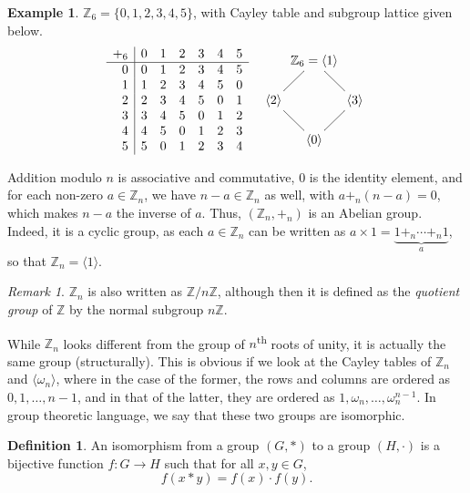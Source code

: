 \documentclass[svgnames]{article}
\theoremstyle{definition}
\newtheorem{Definition}[Definition]{Definition}
\newtheorem{Example}[Example]{Example}
\theoremstyle{remark}
\newtheorem*{Remark*}{Remark}
\newcommand{\nth}{\textsuperscript{th}\xspace}
\newcommand{\newterm}[1]{{\color{alertcolor} #1}}
\begin{document}
\begin{appendices}
\begin{Example}\label{ex:Z6}
$\mathbb Z_6 = \{0, 1, 2, 3, 4, 5\}$, with Cayley table and subgroup lattice given below.
\begin{align*}
\begin{array}{r|cccccc}
+_6		&	0	&	1	&	2	&	3	&	4	&	5\\
\hline
0		&	0	&	1	&	2	&	3	&	4	&	5\\
1		&	1	&	2	&	3	&	4	&	5	&	0\\
2		&	2	&	3	&	4	&	5	&	0	&	1\\
3		&	3	&	4	&	5	&	0	&	1	&	2\\
4		&	4	&	5	&	0	&	1	&	2	&	3\\
5		&	5	&	0	&	1	&	2	&	3	&	4
\end{array} && 
\vcenter{\xymatrix@C=1px@R=1.5em{
&	\mathbb Z_6 = \langle 1 \rangle \ar@{-}[dl] \ar@{-}[dr]\\
\langle 2 \rangle && \langle 3 \rangle\\
& \langle 0 \rangle \ar@{-}[ul] \ar@{-}[ur]
}}
\end{align*}
\end{Example}

Addition modulo $n$ is associative and commutative, $0$ is the identity element, and for each non-zero $a \in \mathbb Z_n$, we have $n - a \in \mathbb Z_n$ as well, with $a +_n (n - a) = 0$, which makes $n - a$ the inverse of $a$. Thus, $(\mathbb Z_n, +_n)$ is an Abelian group. Indeed, it is a cyclic group, as each $a \in \mathbb Z_n$ can be written as $a \times 1 = \underbrace{1 +_n \cdots +_n 1}_{a}$, so that $\mathbb Z_n = \langle 1 \rangle$.

\begin{Remark*}
$\mathbb Z_n$ is also written as $\mathbb Z/n \mathbb Z$, although then it is defined as the \emph{quotient group} of $\mathbb Z$ by the normal subgroup $n \mathbb Z$.
\end{Remark*}

While $\mathbb Z_n$ looks different from the group of $n$\nth roots of unity, it is actually the same group (structurally). This is obvious if we look at the Cayley tables of $\mathbb Z_n$ and $\langle \omega_n \rangle$, where in the case of the former, the rows and columns are ordered as $0, 1, \ldots, n - 1$, and in that of the latter, they are ordered as $1, \omega_n, \ldots, \omega_n^{n - 1}$. In group theoretic language, we say that these two groups are \newterm{isomorphic}.

\begin{Definition}\label{def:Isomorphism}
An isomorphism from a group $(G, *)$ to a group $(H, \cdot)$ is a bijective function $f \colon G \to H$ such that for all $x, y \in G$,
\begin{equation*}
f(x * y) = f(x) \cdot f(y).
\end{equation*}
\end{Definition}


\end{appendices}
\end{document}
